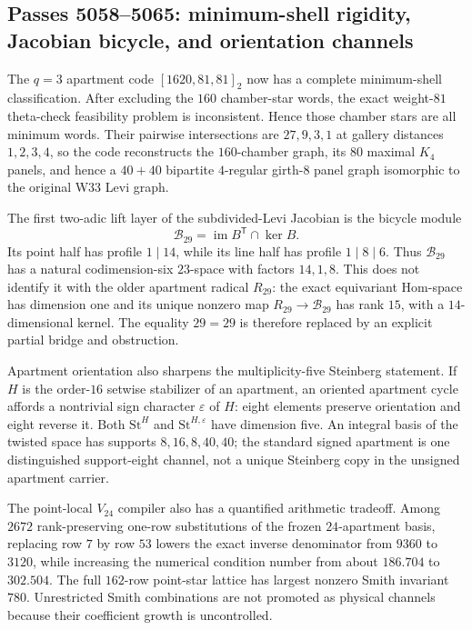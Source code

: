 \ifdefined\WPassFiveZeroFiveEightLoaded\else
\gdef\WPassFiveZeroFiveEightLoaded{1}
\subsection*{Passes 5058--5065: minimum-shell rigidity, Jacobian bicycle, and orientation channels}
The $q=3$ apartment code $[1620,81,81]_2$ now has a complete minimum-shell classification.  After excluding the $160$ chamber-star words, the exact weight-$81$ theta-check feasibility problem is inconsistent.  Hence those chamber stars are all minimum words.  Their pairwise intersections are $27,9,3,1$ at gallery distances $1,2,3,4$, so the code reconstructs the $160$-chamber graph, its $80$ maximal $K_4$ panels, and hence a $40+40$ bipartite $4$-regular girth-$8$ panel graph isomorphic to the original W33 Levi graph.

The first two-adic lift layer of the subdivided-Levi Jacobian is the bicycle module
\[
\mathcal B_{29}=\operatorname{im}B^{\mathsf T}\cap\ker B.
\]
Its point half has profile $1\mid14$, while its line half has profile $1\mid8\mid6$.  Thus $\mathcal B_{29}$ has a natural codimension-six $23$-space with factors $14,1,8$.  This does not identify it with the older apartment radical $R_{29}$: the exact equivariant Hom-space has dimension one and its unique nonzero map $R_{29}\to\mathcal B_{29}$ has rank $15$, with a $14$-dimensional kernel.  The equality $29=29$ is therefore replaced by an explicit partial bridge and obstruction.

Apartment orientation also sharpens the multiplicity-five Steinberg statement.  If $H$ is the order-$16$ setwise stabilizer of an apartment, an oriented apartment cycle affords a nontrivial sign character $\varepsilon$ of $H$: eight elements preserve orientation and eight reverse it.  Both $\mathrm{St}^{H}$ and $\mathrm{St}^{H,\varepsilon}$ have dimension five.  An integral basis of the twisted space has supports $8,16,8,40,40$; the standard signed apartment is one distinguished support-eight channel, not a unique Steinberg copy in the unsigned apartment carrier.

The point-local $V_{24}$ compiler also has a quantified arithmetic tradeoff.  Among $2672$ rank-preserving one-row substitutions of the frozen $24$-apartment basis, replacing row $7$ by row $53$ lowers the exact inverse denominator from $9360$ to $3120$, while increasing the numerical condition number from about $186.704$ to $302.504$.  The full $162$-row point-star lattice has largest nonzero Smith invariant $780$.  Unrestricted Smith combinations are not promoted as physical channels because their coefficient growth is uncontrolled.

